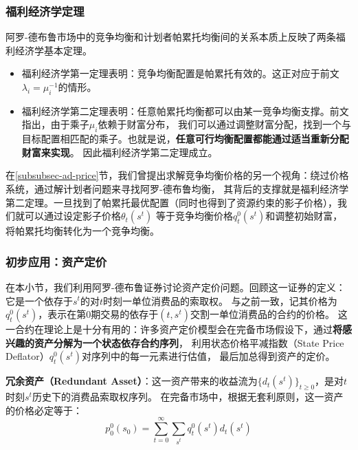 \subsubsection{福利经济学定理}

阿罗-德布鲁市场中的竞争均衡和计划者帕累托均衡间的关系本质上反映了两条福利经济学基本定理。
\begin{itemize}
    \item 福利经济学第一定理表明：竞争均衡配置是帕累托有效的。这正对应于前文$\lambda_i=\mu_i^{-1}$的情形。
    \item 福利经济学第二定理表明：任意帕累托均衡都可以由某一竞争均衡支撑。前文指出，由于乘子$\mu_i$依赖于财富分布，
        我们可以通过调整财富分配，找到一个与目标配置相匹配的乘子。也就是说，\textbf{任意可行均衡配置都能通过适当重新分配财富来实现}。
        因此福利经济学第二定理成立。
\end{itemize}

在\ref{subsubsec-ad-price}节，我们曾提出求解竞争均衡价格的另一个视角：绕过价格系统，通过解计划者问题来寻找阿罗-德布鲁均衡，
其背后的支撑就是福利经济学第二定理。一旦找到了帕累托最优配置（同时也得到了资源约束的影子价格），我们就可以通过设定影子价格$\theta_t\left(s^t\right)$
等于竞争均衡价格$q_t^0\left(s^t\right)$和调整初始财富，将帕累托均衡转化为一个竞争均衡。


\subsubsection{初步应用：资产定价}

在本小节，我们利用阿罗-德布鲁证券讨论资产定价问题。回顾这一证券的定义：它是一个依存于$s^t$的对$t$时刻一单位消费品的索取权。
与之前一致，记其价格为$q_t^0\left(s^t\right)$，表示在第$0$期交易的依存于$(t,s^t)$交割一单位消费品的合约的价格。
这一合约在理论上是十分有用的：许多资产定价模型会在完备市场假设下，通过\textbf{将感兴趣的资产分解为一个状态依存合约序列}，
利用状态价格平减指数（State Price Deflator）$q_t^0\left(s^t\right)$对序列中的每一元素进行估值，
最后加总得到资产的定价。

\begin{example}
    \textbf{冗余资产（Redundant Asset）}：这一资产带来的收益流为$\{d_t\left(s^t\right)\}_{t\geq 0}$，是对$t$时刻$s^t$历史下的消费品索取权序列。
    在完备市场中，根据无套利原则，这一资产的价格必定等于：
    \begin{equation}    \label{eq-price-redundant}
        p_0^0\left(s_0\right)=\sum_{t=0}^{\infty} \sum_{s^t} q_t^0\left(s^t\right) d_t\left(s^t\right)
    \end{equation}
\end{example}

